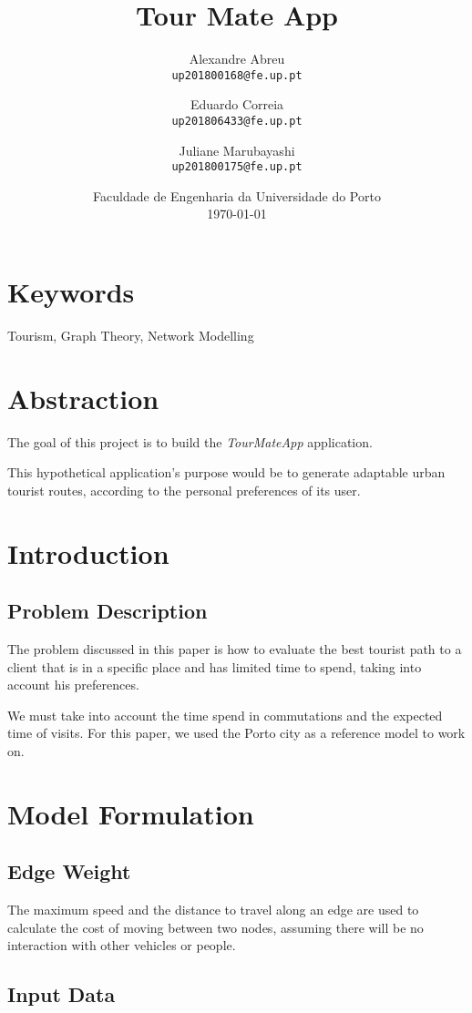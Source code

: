 \documentclass{article}
\title{\textbf{Tour Mate App}}
\author{
    Alexandre Abreu\\
    \texttt{up201800168@fe.up.pt}
    \and
    Eduardo Correia\\
    \texttt{up201806433@fe.up.pt}
    \and
    Juliane Marubayashi\\
    \texttt{up201800175@fe.up.pt}
}
\date{
    Faculdade de Engenharia da Universidade do Porto\\
    \today
}
\begin{document}
\maketitle

\section*{Keywords}

Tourism, Graph Theory, Network Modelling

\section*{Abstraction} 
    The goal of this project is to build the \textit{TourMateApp} application. \par 
    This hypothetical application's purpose would be to generate adaptable urban tourist routes, according to the personal preferences of its user.\par

\section*{Introduction}
\subsection*{Problem Description}
    The problem discussed in this paper is how to evaluate the best tourist path to a client that is in a specific place and has limited time to spend, taking into account his preferences.\par
    We must take into account the time spend in commutations and the expected time of visits.
    For this paper, we used the Porto city as a reference model to work on.

\section*{Model Formulation}
\subsection*{Edge Weight}
    The maximum speed and the distance to travel along an edge are used to calculate the cost of moving between two nodes, assuming there will be no interaction with other vehicles or people.
    
\subsection*{Input Data}
\end{document}
